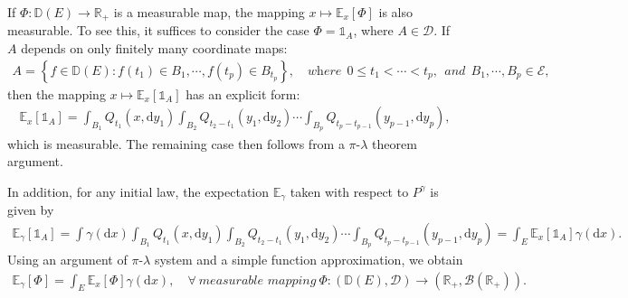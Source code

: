 \documentclass{article}
\numberwithin{equation}{section}
\newcommand{\E}{\mathbb{E}}
\renewcommand{\d}{\mathrm{d}}
\theoremstyle{plain}
\theoremstyle{definition}
\begin{document}
If $\Phi:\mathbb{D}(E)\to\mathbb{R}_+$ is a measurable map, the mapping $x\mapsto\E_x[\Phi]$ is also measurable. To see this, it suffices to consider the case $\Phi=\mathds{1}_A$, where $A\in\mathscr{D}$. If $A$ depends on only finitely many coordinate maps:
\begin{align*}
	A=\left\{f\in\mathbb{D}(E):f(t_1)\in B_1,\cdots,f(t_p)\in B_{t_p}\right\},\quad\textit{where}\ \ 0\leq t_1<\cdots<t_p,\ \ \textit{and}\ \ B_1,\cdots,B_p\in\mathscr{E},\tag{6.6}\label{eq:6.6}
\end{align*}
then the mapping $x\mapsto\E_x[\mathds{1}_A]$ has an explicit form:
\begin{align*}
	\E_x[\mathds{1}_A]= \int_{B_1}Q_{t_1}(x,\d y_1)\int_{B_2}Q_{t_2-t_1}(y_1,\d y_2)\cdots \int_{B_p}Q_{t_p-t_{p-1}}(y_{p-1},\d y_p),
\end{align*}
which is measurable. The remaining case then follows from a $\pi$-$\lambda$ theorem argument.

In addition, for any initial law, the expectation $\E_\gamma$ taken with respect to $P^\gamma$ is given by
\begin{align*}
	\E_\gamma[\mathds{1}_A]=\int\gamma(\d x)\int_{B_1}Q_{t_1}(x,\d y_1)\int_{B_2}Q_{t_2-t_1}(y_1,\d y_2)\cdots \int_{B_p}Q_{t_p-t_{p-1}}(y_{p-1},\d y_p)=\int_E\E_x[\mathds{1}_A]\gamma(\d x).
\end{align*}
Using an argument of $\pi$-$\lambda$ system and a simple function approximation, we obtain
\begin{align*}
	\E_\gamma[\Phi]=\int_E\E_x[\Phi]\gamma(\d x),\quad\forall\ \textit{measurable\ mapping}\ \Phi:(\mathbb{D}(E),\mathscr{D})\to(\mathbb{R}_+,\mathscr{B}(\mathbb{R}_+)).
\end{align*}
\end{document}
